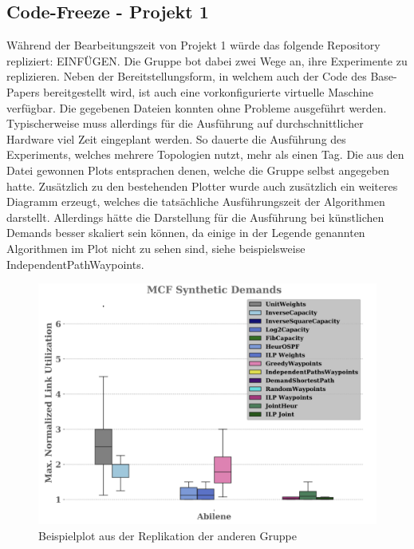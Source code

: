 \documentclass[sigconf,noacm,review]{acmart}
\begin{document}
\subsection{Code-Freeze - Projekt 1}
Während der Bearbeitungszeit von Projekt 1 würde das folgende Repository repliziert: EINFÜGEN.
Die Gruppe bot dabei zwei Wege an, ihre Experimente zu replizieren. Neben der Bereitstellungsform, in welchem auch der Code des Base-Papers bereitgestellt wird, ist auch eine vorkonfigurierte virtuelle Maschine verfügbar.
Die gegebenen Dateien konnten ohne Probleme ausgeführt werden. Typischerweise muss allerdings für die Ausführung auf durchschnittlicher Hardware viel Zeit eingeplant werden.
So dauerte die Ausführung des Experiments, welches mehrere Topologien nutzt, mehr als einen Tag. 
Die aus den Datei gewonnen Plots entsprachen denen, welche die Gruppe selbst angegeben hatte.
Zusätzlich zu den bestehenden Plotter wurde auch zusätzlich ein weiteres Diagramm erzeugt, 
welches die tatsächliche Ausführungszeit der Algorithmen darstellt. Allerdings hätte die Darstellung für die Ausführung bei künstlichen Demands besser skaliert sein können, da einige in der Legende genannten Algorithmen im Plot nicht zu sehen sind, siehe beispielsweise IndependentPathWaypoints. 
\begin{figure}[h]
  \centering
  \includegraphics[width=\linewidth]{abbildungen/replik1}
  \caption{Beispielplot aus der Replikation der anderen Gruppe}
\end{figure}
\end{document}
